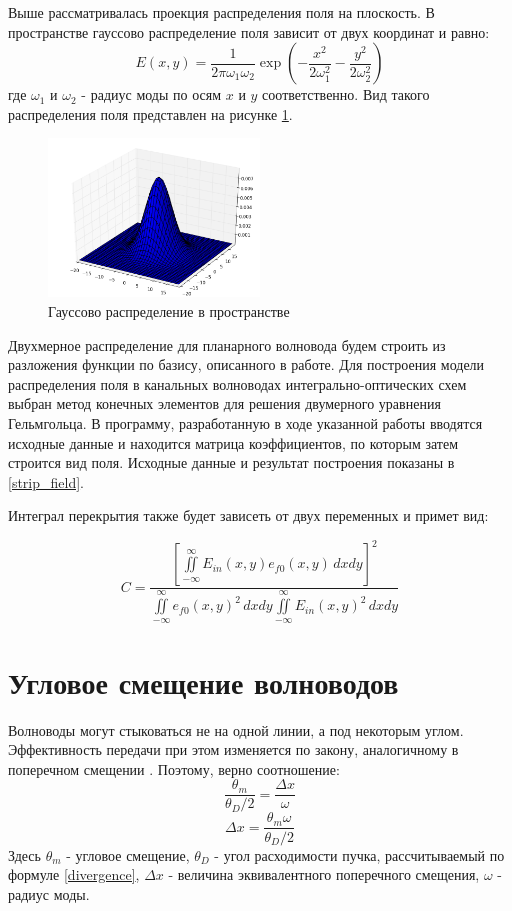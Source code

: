 Выше рассматривалась проекция распределения поля на плоскость. В пространстве гауссово распределение поля зависит от двух координат и равно:
\begin{equation}
  \label{gauss3d}
  E(x,y)=\frac{1}{2\pi\omega_1\omega_2}\exp\left(-\frac{x^2}{2\omega_1^2}-\frac{y^2}{2\omega_2^2}\right)
\end{equation}
где $\omega_1$ и $\omega_2$ - радиус моды по осям $x$ и $y$ соответственно. Вид такого распределения поля представлен на рисунке \ref{gauss3dPlot}.
\begin{figure}[h!]
	\includegraphics[width=0.5\textwidth]{img/gauss3d.png}
	\caption{Гауссово распределение в пространстве}
	\label{gauss3dPlot}
\end{figure}

Двухмерное распределение для планарного волновода будем строить из разложения функции по базису, описанного в работе\cite{vlada}. Для построения модели распределения поля в канальных волноводах интегрально-оптических схем выбран метод конечных элементов для решения двумерного уравнения Гельмгольца. В программу, разработанную в ходе указанной работы вводятся исходные данные и находится матрица коэффициентов, по которым затем строится вид поля. Исходные данные и результат построения показаны в \ref{strip_field}.

Интеграл перекрытия также будет зависеть от двух переменных и примет вид:

\begin{equation}
	\label{coupling_2d}
	C = \frac{\left[\iint\limits_{-\infty}^{\infty}E_{in}(x,y)e_{f0}(x,y) \,dxdy\right]^2}
	{\iint\limits_{-\infty}^{\infty}e_{f0}(x,y)^2 \,dxdy
	 \iint\limits_{-\infty}^{\infty}E_{in}(x,y)^2 \,dxdy}
\end{equation}

\section{Угловое смещение волноводов}
Волноводы могут стыковаться не на одной линии, а под некоторым углом. Эффективность передачи при этом изменяется по закону, аналогичному в поперечном смещении \cite{lefevre}. Поэтому, верно соотношение:
\begin{equation}
	\frac{\theta_m}{\theta_D/2}	= \frac{\Delta x}{\omega}
\end{equation}
\begin{equation}
	\Delta x = \frac{\theta_m \omega}{\theta_D/2}
	\label{transverse_analog}
\end{equation}
Здесь $\theta_m$ - угловое смещение, $\theta_D$ - угол расходимости пучка, рассчитываемый по формуле \ref{divergence}, $\Delta x$ - величина эквивалентного поперечного смещения, $\omega$ - радиус моды. 

